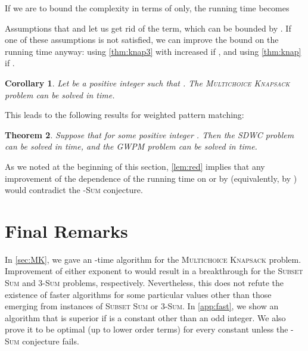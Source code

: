 \documentclass{article}
\theoremstyle{plain}
\newtheorem{theorem}{Theorem}[section]
\newtheorem{corollary}[theorem]{Corollary}
\theoremstyle{definition}
\newcommand{\MK}{\textsc{Multichoice Knapsack}\xspace}
\newcommand{\GWPM}{\textsc{GWPM}\xspace}
\newcommand{\SDWC}{\textsc{SDWC}\xspace}
\newcommand{\SubsetSum}{\textsc{Subset Sum}\xspace}
\newcommand{\Sum}{\textsc{Sum}\xspace}
\begin{document}
  
    If we are to bound the complexity in terms of  only, the running time becomes
    
    Assumptions that  and  let us get rid of the  term, which can be bounded by .
    If one of these assumptions is not satisfied, we can improve the bound on the running time anyway:
    using \cref{thm:knap3} with increased  if , and using \cref{thm:knap} if .
    
    \begin{corollary}
    Let  be a positive integer such that . The \MK problem can be solved in  time.
    \end{corollary}
    
    This leads to the following results for weighted pattern matching:
    
   \begin{theorem}\label{thm:fast}
	Suppose that  for some positive integer .
	Then the \SDWC problem can be solved in  time,
	and the \GWPM problem can be solved in  time.
	\end{theorem}	
    
    As we noted at the beginning of this section, \cref{lem:red} implies that
    any improvement of the dependence of the running time on  or  by  (equivalently, by )
    would contradict the -\Sum conjecture.
	

  \section{Final Remarks}\label{sec:fr}
  In \cref{sec:MK}, we gave an -time algorithm for the \MK problem.
  Improvement of either exponent to  would result in a breakthrough for the \SubsetSum and 3-\Sum problems,
  respectively. 
  Nevertheless, this does not refute the existence of faster algorithms for some particular values 
  other than those emerging from instances of \SubsetSum or 3-\Sum.
  In \cref{app:fast}, we show an algorithm that is superior if  is a constant other than an odd integer.
  We also prove it to be optimal (up to lower order terms) for every constant 
  unless the -\Sum conjecture fails.

  
  
\end{document}
